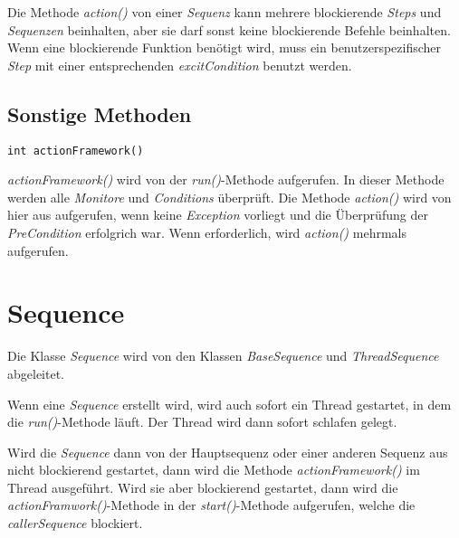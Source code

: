 Die Methode \textit{action()} von einer \textit{Sequenz} kann mehrere blockierende \textit{Steps} und \textit{Sequenzen} beinhalten, aber sie darf sonst keine blockierende Befehle beinhalten.
Wenn eine blockierende Funktion benötigt wird, muss ein benutzerspezifischer \textit{Step} mit einer entsprechenden \textit{excitCondition} benutzt werden.



\subsection{Sonstige Methoden}
\begin{lstlisting}
int actionFramework()
\end{lstlisting}
\textit{actionFramework()} wird von der \textit{run()}-Methode aufgerufen.
In dieser Methode werden alle \textit{Monitore} und \textit{Conditions} überprüft.
Die Methode \textit{action()} wird von hier aus aufgerufen, wenn keine \textit{Exception} vorliegt und die Überprüfung der \textit{PreCondition} erfolgrich war.
Wenn erforderlich, wird \textit{action()} mehrmals aufgerufen.



%
%







\section{Sequence}
Die Klasse \textit{Sequence} wird von den Klassen \textit{BaseSequence} und \textit{ThreadSequence} abgeleitet.

Wenn eine \textit{Sequence} erstellt wird, wird auch sofort ein Thread gestartet, in dem die \textit{run()}-Methode läuft.
Der Thread wird dann sofort schlafen gelegt.

Wird die \textit{Sequence} dann von der Hauptsequenz oder einer anderen Sequenz aus nicht blockierend gestartet, dann wird die Methode \textit{actionFramework()} im Thread ausgeführt.
Wird sie aber blockierend gestartet, dann wird die \textit{actionFramwork()}-Methode in der \textit{start()}-Methode aufgerufen, welche die \textit{callerSequence} blockiert.



